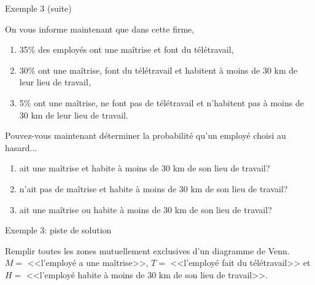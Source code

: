\documentclass{BeamerTemplate}
\begin{document}
\begin{frame}[t]{Exemple 3 (suite)}

{\footnotesize
 On vous informe maintenant que dans cette firme,
 \begin{enumerate}[$\bullet$]
 \item 35\%  des employés ont une maîtrise et font du télétravail,
 \item 30\% ont une maîtrise, font du télétravail et habitent à moins de 30 km de leur lieu de travail,
 \item 5\% ont une maîtrise, ne font pas de télétravail et n'habitent pas à moins de 30 km de leur lieu de travail.
 \end{enumerate}
 Pouvez-vous maintenant déterminer la probabilité qu'un employé choisi au hasard...
     \begin{enumerate}\itemsep 5mm
      \item[(ii)] ait une maîtrise et habite à moins de 30 km de son lieu de travail?%
      \item[(iii)] n'ait pas de maîtrise et habite à moins de 30 km de son lieu de travail? %
      \item[(iv)] ait une maîtrise ou habite à moins de 30 km de son lieu de travail?%
     \end{enumerate}
}
\end{frame}

\begin{frame}[t]{Exemple 3: piste de solution}

{\small
 Remplir toutes les zones mutuellement exclusives d'un diagramme de Venn.\\
 $M=$ <<l'employé a une maîtrise>>, $T=$ <<l'employé fait du télétravail>> et $H=$ <<l'employé habite à moins de 30 km de son lieu de travail>>. %
}


\begin{center}
\end{center}



\end{frame}
\end{document}

